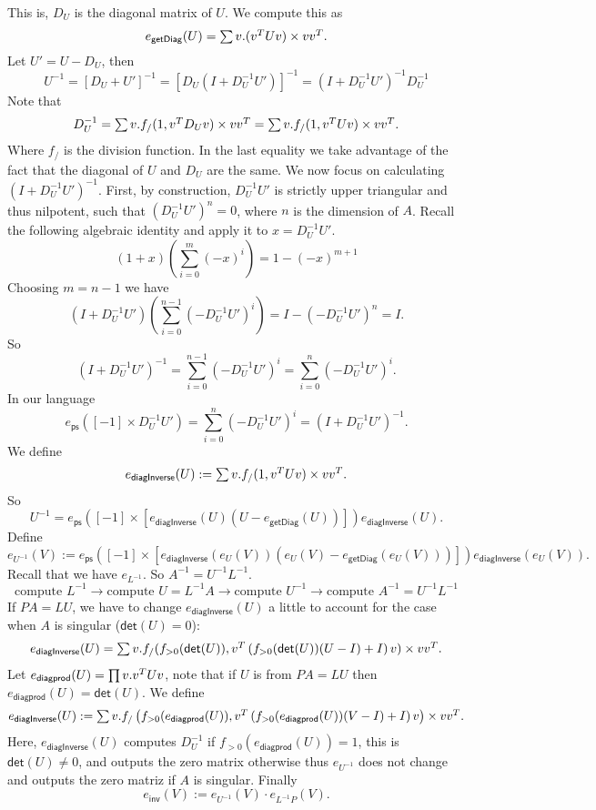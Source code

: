 This is, $D_U$ is the diagonal matrix of $U$. We compute this as $$ e_{\mathsf{getDiag}}(U) = \textstyle\sum v. (v^TUv) \times vv^T.$$
Let $U'=U-D_U$, then $$ U^{-1}=\left[ D_U+U' \right]^{-1}= \left[ D_U\left( I+D_U^{-1}U'\right) \right]^{-1} = \left( I+D_U^{-1}U'\right)^{-1}D_U^{-1} $$
Note that $$D_U^{-1}=\textstyle\sum v. f_{/}(1,v^TD_Uv)\times vv^T=\textstyle\sum v. f_{/}(1,v^TUv)\times vv^T.$$
Where $f_{/}$ is the division function. In the last equality we take advantage of the fact that the diagonal of $U$ and $D_U$ are the same.
We now focus on calculating $\left( I+D_U^{-1}U'\right)^{-1}$. First, by construction, $D_U^{-1}U'$ is strictly upper triangular and thus nilpotent, such that $\left( D_U^{-1}U'\right)^n=0$, where $n$ is the dimension of $A$. Recall the following algebraic identity and apply it to $x=D_U^{-1}U'$. $$(1+x)\left( \sum_{i=0}^{m}(-x)^i \right)=1-(-x)^{m+1}$$
Choosing $m=n-1$ we have $$\left(I+D_U^{-1}U' \right)\left( \sum_{i=0}^{n-1}(-D_U^{-1}U')^i \right)=I- \left( -D_U^{-1}U'\right)^n =I. $$
So $$\left(I+D_U^{-1}U' \right)^{-1}=\sum_{i=0}^{n-1}(-D_U^{-1}U')^i=\sum_{i=0}^{n}(-D_U^{-1}U')^i.$$
In our language $$e_{\mathsf{ps}}([-1]\times D_U^{-1}U')=\sum_{i=0}^{n}(-D_U^{-1}U')^i=\left(I+D_U^{-1}U' \right)^{-1}.$$
We define $$e_{\mathsf{diagInverse}}(U):=\textstyle\sum v. f_{/}(1,v^TUv)\times vv^T.$$
So $$U^{-1}= e_{\mathsf{ps}}\left([-1]\times \left[e_{\mathsf{diagInverse}}(U)(U-e_{\mathsf{getDiag}}(U))\right] \right)e_{\mathsf{diagInverse}}(U).$$
Define $$e_{U^{-1}}(V):= e_{\mathsf{ps}}\left([-1]\times \left[e_{\mathsf{diagInverse}}(e_U(V))(e_U(V)-e_{\mathsf{getDiag}}(e_U(V)))\right] \right)e_{\mathsf{diagInverse}}(e_U(V)).$$
Recall that we have $e_{L^{-1}}.$ So $A^{-1}=U^{-1}L^{-1}.$
$$\text{compute }L^{-1}\rightarrow\text{compute }U=L^{-1}A\rightarrow\text{compute }U^{-1}\rightarrow\text{compute }A^{-1}=U^{-1}L^{-1}$$
If $PA=LU$, we have to change $e_{\mathsf{diagInverse}}(U)$ a little to account for the case when $A$ is singular ($\mathsf{det}(U)=0$):
$$e_{\mathsf{diagInverse}}(U)=\textstyle\sum v. f_{/}(f_{>0}(\mathsf{det}(U)),v^T\left( f_{>0}(\mathsf{det}(U))(U-I) + I \right)v)\times vv^T.$$
Let $e_{\mathsf{diagprod}}(U)=\textstyle\prod v. v^TUv$, note that if $U$ is from $PA=LU$ then $e_{\mathsf{diagprod}}(U)=\mathsf{det}(U)$. We define
$$e_{\mathsf{diagInverse}}(U):=\textstyle\sum v. f_{/}\left(f_{>0}(e_{\mathsf{diagprod}}(U)),v^T\left( f_{>0}(e_{\mathsf{diagprod}}(U))(V-I) + I \right)v\right)\times vv^T.$$
Here, $e_{\mathsf{diagInverse}}(U)$ computes $D_U^{-1}$ if $f_{>0}(e_{\mathsf{diagprod}}(U))=1$, this is $\mathsf{det}(U)\neq 0$, and outputs the zero matrix otherwise thus $e_{U^{-1}}$ does not change and outputs the zero matriz if $A$ is singular.
Finally $$e_{\mathsf{inv}}(V):=e_{U^{-1}}(V)\cdot e_{L^{-1}P}(V).$$
